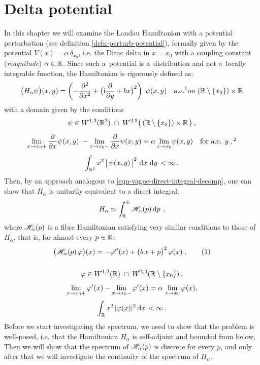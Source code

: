 \chapter{Delta potential} \label{chapter-dirac}
In this chapter we will examine the Landau Hamiltonian with a potential perturbation (see definition \ref{defn-perturb-potential}), formally given by the potential $V(x) = \alpha\,\delta_{x_0}$, i.e. the Dirac delta in $x=x_0$ with a coupling constant (\textit{magnitude}) $\alpha \in \mathbb{R}$. Since such a~potential is a~distribution and not a~locally integrable function, the Hamiltonian is rigorously defined as:
\begin{equation*}
    \big( H_\alpha \psi \big)(x, y) = \left( -\pd{^2}{x^2} + \big( \i\pd{}{y} + bx \big)^2 \right) \; \psi(x,y)
    \quad \text{a.e.\footnotemark on } (\R \setminus \{ x_0 \}) \times \R
\end{equation*}
with a domain given by the conditions
\begin{gather*}
    \psi \in W^{1,2}(\R^2) \; \cap \; W^{2,2}\big( \,(\R \setminus \{ x_0 \}) \times \R \, \big) \: ,
    \\[5pt]
    \lim_{x \to x_0 +} \pd{}{x}\psi(x,y)\; - \lim_{x \to x_0 -} \pd{}{x}\psi(x,y) = \alpha \lim_{x \to x_0} \!\psi(x, y)
    \quad \text{for a.e. } y \: ,\footnotemark
    \\[5pt]
    \int_{\R^2} x^2 \, \big|\, \psi(x,y) \,\big|^2 \, \d{x}\d{y} < \infty \: .
\end{gather*}
Then, by an approach analogous to \eqref{eqn-vague-direct-integral-decomp}, one can show that $H_\alpha$ is unitarily equivalent to a direct integral:
\begin{equation*}
    H_\alpha \simeq \int^\oplus_{\mathbb{R}} \mathscr{H}_\alpha(p) \, \mathrm{d}p \, \: ,
\end{equation*}
where $\mathscr{H}_\alpha(p)$ is a fibre Hamiltonian satisfying very similar conditions to those of~$H_\alpha$, that is, for almost every $p \in \mathbb{R}$:
\begin{gather*}
    \big( \Hf_\alpha(p) \, \varphi \big)(x)
    = -\varphi''(x)
    + \big( b \, x + p \big)^2 \, \varphi(x) \: ,
    \numberthis\label{eqn-dirac-fibre-hamiltonian}
    \\[15pt]
    \varphi \in W^{1,2}(\R) \; \cap \; W^{2,2}( \R \setminus \{ x_0 \}) \: ,
    \\[5pt]
    \lim_{x \to x_0+} \varphi'(x) - \lim_{x \to x_0-} \varphi'(x) = \alpha \, \lim_{x \to x_0} \varphi(x),
    \\[3pt]
    \int_\R x^2 \, |\varphi(x)|^2 \d{x} < \infty \: .
\end{gather*}
Before we start investigating the spectrum, we need to show that the problem is well-posed, i.e. that the Hamiltonian $H_\alpha$ is self-adjoint and bounded from below. Then we will show that the spectrum of $\mathscr{H}_\alpha(p)$ is discrete for every $p$, and only after that we will investigate the continuity of the spectrum of $H_\alpha$.

